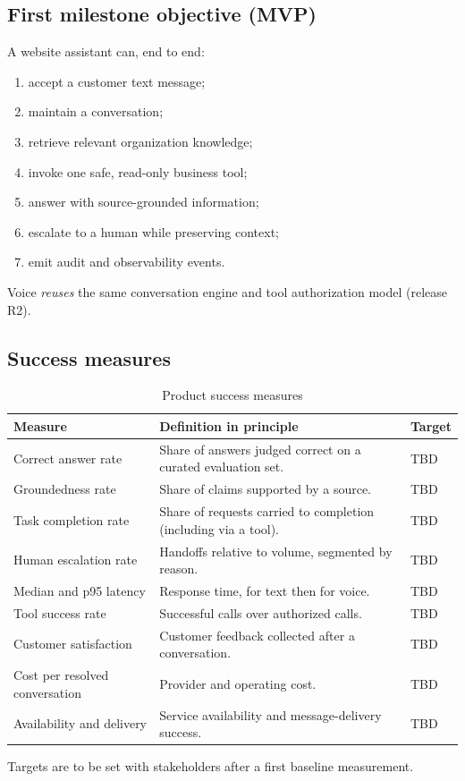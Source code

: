 \subsection{First milestone objective (MVP)}
A website assistant can, end to end:
\begin{enumerate}
  \item accept a customer text message;
  \item maintain a conversation;
  \item retrieve relevant organization knowledge;
  \item invoke one safe, read-only business tool;
  \item answer with source-grounded information;
  \item escalate to a human while preserving context;
  \item emit audit and observability events.
\end{enumerate}
Voice \emph{reuses} the same conversation engine and tool authorization model (release R2).

\subsection{Success measures}
\begin{table}[htbp]
\centering\caption{Product success measures}\label{tab:kpi}
\begin{tabular}{@{}p{4.8cm}p{7.2cm}p{3.6cm}@{}}
\toprule \textbf{Measure} & \textbf{Definition in principle} & \textbf{Target} \\ \midrule
Correct answer rate & Share of answers judged correct on a curated evaluation set. & TBD \\
Groundedness rate & Share of claims supported by a source. & TBD \\
Task completion rate & Share of requests carried to completion (including via a tool). & TBD \\
Human escalation rate & Handoffs relative to volume, segmented by reason. & TBD \\
Median and p95 latency & Response time, for text then for voice. & TBD \\
Tool success rate & Successful calls over authorized calls. & TBD \\
Customer satisfaction & Customer feedback collected after a conversation. & TBD \\
Cost per resolved conversation & Provider and operating cost. & TBD \\
Availability and delivery & Service availability and message-delivery success. & TBD \\
\bottomrule
\end{tabular}
\end{table}
Targets are to be set with stakeholders after a first baseline measurement.

